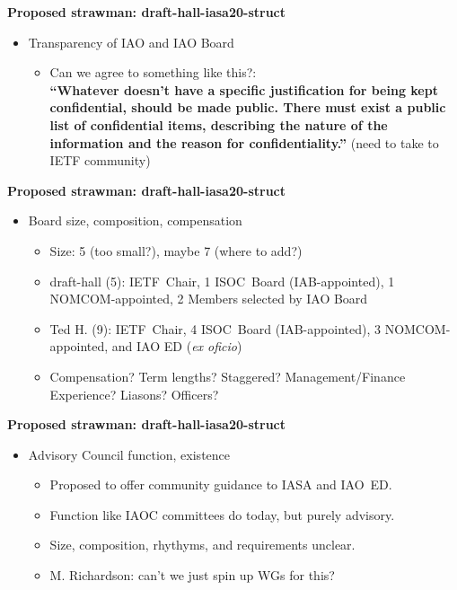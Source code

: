 \documentclass[helvetica]{seminar}
\newcommand{\heading}[1]{%
  \begin{center} 
    \large\bf 
    #1 
  \end{center} 
  \vspace{.4 in}}
\begin{document}
\begin{slide}

\heading{Proposed strawman: draft-hall-iasa20-struct}

\begin{itemize}
\item Transparency of IAO and IAO Board
  \begin{itemize}
  \item Can we agree to something like this?:\\\textbf{``Whatever
    doesn't have a specific justification for being kept confidential,
    should be made public.  There must exist a public list of
    confidential items, describing the nature of the information and
    the reason for confidentiality.''} (need to take to IETF
    community)
  \end{itemize}
\end{itemize}

\end{slide}



\begin{slide}

\heading{Proposed strawman: draft-hall-iasa20-struct}

\begin{itemize}
\item Board size, composition, compensation
  \begin{itemize}
  \item Size: 5 (too small?), maybe 7 (where to add?)
  \item draft-hall (5): IETF~Chair, 1 ISOC~Board (IAB-appointed), 1
    NOMCOM-appointed, 2 Members selected by IAO Board
  \item Ted H. (9): IETF~Chair, 4 ISOC~Board (IAB-appointed), 3
    NOMCOM-appointed, and IAO ED (\textit{ex oficio})
  \item Compensation? Term lengths? Staggered? Management/Finance
    Experience? Liasons? Officers?
  \end{itemize}
\end{itemize}

\end{slide}



\begin{slide}

\heading{Proposed strawman: draft-hall-iasa20-struct}

\begin{itemize}
\item Advisory Council function, existence
  \begin{itemize}
  \item Proposed to offer community guidance to IASA and IAO~ED.
  \item Function like IAOC committees do today, but purely advisory.
  \item Size, composition, rhythyms, and requirements unclear.
  \item M. Richardson: can't we just spin up WGs for this?
  \end{itemize}
\end{itemize}

\end{slide}
\end{document}
